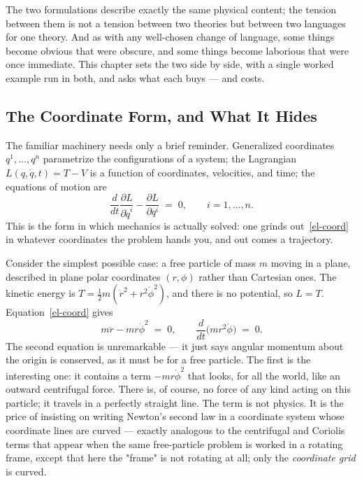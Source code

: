 The two formulations describe exactly the same physical content; the
tension between them is not a tension between two theories but
between two languages for one theory. And as with any well-chosen
change of language, some things become obvious that were obscure,
and some things become laborious that were once immediate. This
chapter sets the two side by side, with a single worked example run
in both, and asks what each buys --- and costs.

\subsection{The Coordinate Form, and What It Hides}

The familiar machinery needs only a brief reminder. Generalized
coordinates $q^1,\dots,q^n$ parametrize the configurations of a
system; the Lagrangian $L(q,\dot q,t) = T - V$ is a function of
coordinates, velocities, and time; the equations of motion are
\begin{equation}
  \frac{d}{dt}\frac{\partial L}{\partial \dot q^i}
  - \frac{\partial L}{\partial q^i} \;=\; 0,
  \qquad i=1,\dots,n.
  \label{el-coord}
\end{equation}
This is the form in which mechanics is actually solved: one grinds
out~\eqref{el-coord} in whatever coordinates the problem hands
you, and out comes a trajectory.

Consider the simplest possible case: a free particle of mass $m$
moving in a plane, described in plane polar coordinates $(r,\phi)$
rather than Cartesian ones. The kinetic energy is $T =
\tfrac12 m(\dot r^2 + r^2\dot\phi^2)$, and there is no potential, so
$L=T$. Equation~\eqref{el-coord} gives
\begin{equation}
  m\ddot r - m r\dot\phi^2 \;=\; 0,
  \qquad
  \frac{d}{dt}\bigl(m r^2\dot\phi\bigr) \;=\; 0.
  \label{polar-free}
\end{equation}
The second equation is unremarkable --- it just says angular
momentum about the origin is conserved, as it must be for a free
particle. The first is the interesting one: it contains a term
$-mr\dot\phi^2$ that looks, for all the world, like an outward
centrifugal force. There is, of course, no force of any kind acting
on this particle; it travels in a perfectly straight line. The term
is not physics. It is the price of insisting on writing Newton's
second law in a coordinate system whose coordinate lines are
curved --- exactly analogous to the centrifugal and Coriolis terms
that appear when the same free-particle problem is worked in a
rotating frame, except that here the "frame" is not rotating at all;
only the \emph{coordinate grid} is curved.

